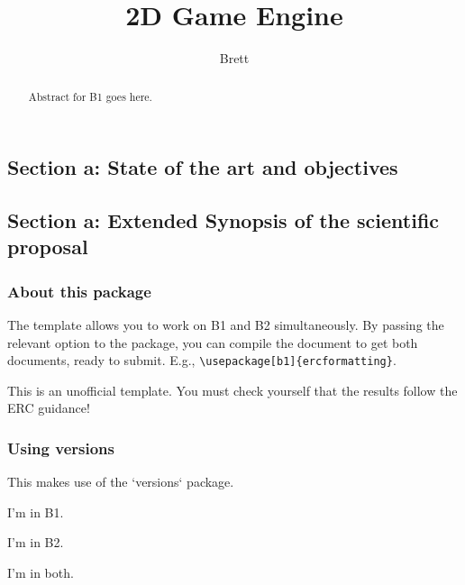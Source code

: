 \documentclass{article}
\author[Sumser]{Brett}
\title{2D Game Engine}
\begin{document}
\maketitle



\begin{b1}
	\begin{abstract}
		Abstract for B1 goes here.
	\end{abstract}
\end{b1}





\begin{b2}
	\part{Section a: State of the art and objectives}
\end{b2}
\begin{b1}
	\part{Section a: Extended Synopsis of the scientific proposal}
\end{b1}


\section{About this package}

The template allows you to work on B1 and B2 simultaneously. By passing the relevant option to the package, you can compile the document to get both documents, ready to submit.  E.g., \verb|\usepackage[b1]{ercformatting}|.


This is an unofficial template. You must check yourself that the results follow the ERC guidance!

\section{Using versions}

This makes use of the `versions` package.

\begin{b1}
I'm in B1.
\end{b1}

\begin{b2}
I'm in B2.
\end{b2}

I'm in both.
\end{document}

